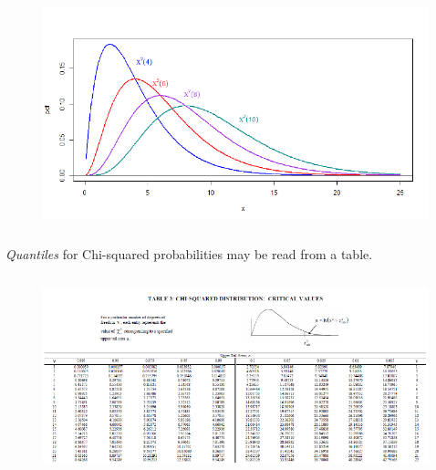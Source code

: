 \documentclass[smaller]{beamer}\usepackage[]{graphicx}\usepackage[]{color}
\begin{document}
\begin{frame}{\secname}

\begin{figure}[ptb]\centering
\includegraphics[height=2.6143in, width=4.6643in]{img/chisquared_pdfs__2.pdf}%
\end{figure}

\emph{Quantiles} for Chi-squared probabilities may be read from a table.

\end{frame}%

\begin{frame}{\secname}



\begin{figure}[ptb]\centering
\includegraphics[height=2.2649in, width=4.9658in]{img/chisq_table__3.pdf}%
\end{figure}

\end{frame}%
\end{document}
